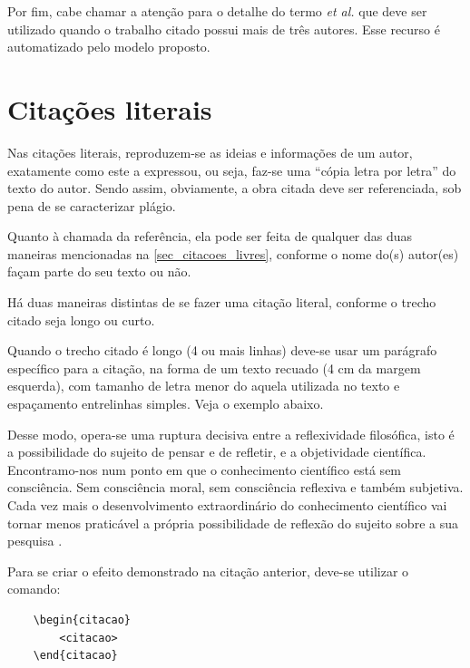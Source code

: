 \begin{apendicesenv}
    Por fim, cabe chamar a atenção para o detalhe do termo \textit{et al.} que deve ser utilizado quando o trabalho citado possui mais de três autores.
    Esse recurso é automatizado pelo modelo proposto.

    \section{Citações literais}
    \label{sec_citacoes_literais}

    Nas citações literais, reproduzem-se as ideias e informações de um autor, exatamente como este a expressou, ou seja, faz-se uma ``cópia letra por letra'' do texto do autor.
    Sendo assim, obviamente, a obra citada deve ser referenciada, sob pena de se caracterizar plágio.

    Quanto à chamada da referência, ela pode ser feita de qualquer das duas maneiras mencionadas na \autoref{sec_citacoes_livres}, conforme o nome do(s) autor(es) façam parte do seu texto ou não.

    Há duas maneiras distintas de se fazer uma citação literal, conforme o trecho citado seja longo ou curto.

    Quando o trecho citado é longo (4 ou mais linhas) deve-se usar um parágrafo específico para a citação, na forma de um texto recuado (4 cm da margem esquerda), com tamanho de letra menor do aquela utilizada no texto e espaçamento entrelinhas simples.
    Veja o exemplo abaixo.

    \begin{citacao}
        Desse modo, opera-se uma ruptura decisiva entre a reflexividade filosófica, isto é a possibilidade do sujeito de pensar e de refletir, e a objetividade científica.     Encontramo-nos num ponto em que o conhecimento científico está sem consciência.
        Sem consciência moral, sem consciência reflexiva e também subjetiva.
        Cada vez mais o desenvolvimento extraordinário do conhecimento científico vai tornar menos praticável a própria possibilidade de reflexão do sujeito sobre a sua pesquisa \cite[p.~28]{Silva2000}.
    \end{citacao}

    Para se criar o efeito demonstrado na citação anterior, deve-se utilizar o comando:

    \begin{verbatim}
    \begin{citacao}
        <citacao>
    \end{citacao}
\end{verbatim}


\end{apendicesenv}
